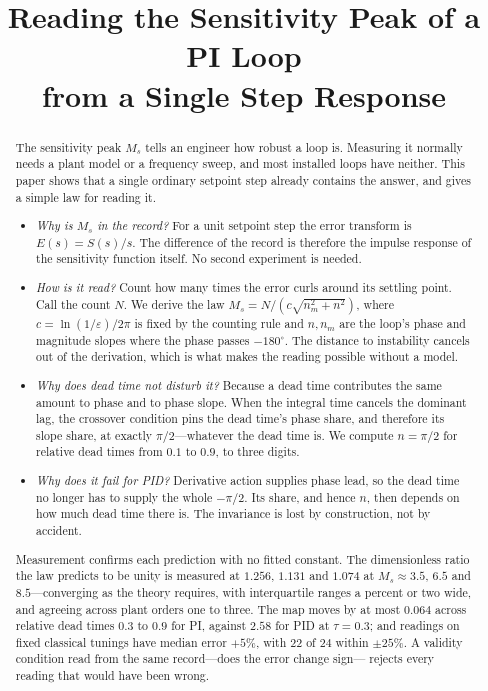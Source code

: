 \documentclass[final,3p,times,twocolumn]{elsarticle}
\begin{document}
\begin{frontmatter}

\title{Reading the Sensitivity Peak of a PI Loop\\
from a Single Step Response}

\begin{abstract}
The sensitivity peak $M_s$ tells an engineer how robust a loop is.
Measuring it normally needs a plant model or a frequency sweep, and most
installed loops have neither. This paper shows that a single ordinary
setpoint step already contains the answer, and gives a simple law for
reading it.

\begin{itemize}
\item \emph{Why is $M_s$ in the record?} For a unit setpoint step the
error transform is $E(s)=S(s)/s$. The difference of the record is
therefore the impulse response of the sensitivity function itself. No
second experiment is needed.

\item \emph{How is it read?} Count how many times the error curls around
its settling point. Call the count $N$. We derive the law
$M_s=N/(c\sqrt{n_m^2+n^2})$, where $c=\ln(1/\varepsilon)/2\pi$ is fixed
by the counting rule and $n,n_m$ are the loop's phase and magnitude
slopes where the phase passes $-180^\circ$. The distance to instability
cancels out of the derivation, which is what makes the reading possible
without a model.

\item \emph{Why does dead time not disturb it?} Because a dead time
contributes the same amount to phase and to phase slope. When the
integral time cancels the dominant lag, the crossover condition pins the
dead time's phase share, and therefore its slope share, at exactly
$\pi/2$---whatever the dead time is. We compute $n=\pi/2$ for relative
dead times from $0.1$ to $0.9$, to three digits.

\item \emph{Why does it fail for PID?} Derivative action supplies phase
lead, so the dead time no longer has to supply the whole $-\pi/2$. Its
share, and hence $n$, then depends on how much dead time there is. The
invariance is lost by construction, not by accident.
\end{itemize}

\noindent
Measurement confirms each prediction with no fitted constant. The
dimensionless ratio the law predicts to be unity is measured at $1.256$,
$1.131$ and $1.074$ at $M_s\approx3.5$, $6.5$ and $8.5$---converging as
the theory requires, with interquartile ranges a percent or two wide,
and agreeing across plant orders one to three. The map moves by at most
$0.064$ across relative dead times $0.3$ to $0.9$ for PI, against
$2.58$ for PID at $\tau=0.3$; and readings on fixed classical tunings
have median error $+5\%$, with $22$ of $24$ within $\pm25\%$. A validity
condition read from the same record---does the error change sign---
rejects every reading that would have been wrong.
\end{abstract}

\end{frontmatter}
\end{document}
